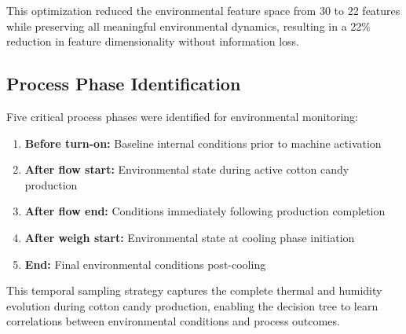 This optimization reduced the environmental feature space from 30 to 22 features while preserving all meaningful environmental dynamics, resulting in a 22\% reduction in feature dimensionality without information loss.

\subsection{Process Phase Identification}

Five critical process phases were identified for environmental monitoring:

\begin{enumerate}
    \item \textbf{Before turn-on:} Baseline internal conditions prior to machine activation
    \item \textbf{After flow start:} Environmental state during active cotton candy production
    \item \textbf{After flow end:} Conditions immediately following production completion
    \item \textbf{After weigh start:} Environmental state at cooling phase initiation
    \item \textbf{End:} Final environmental conditions post-cooling
\end{enumerate}

This temporal sampling strategy captures the complete thermal and humidity evolution during cotton candy production, enabling the decision tree to learn correlations between environmental conditions and process outcomes.
